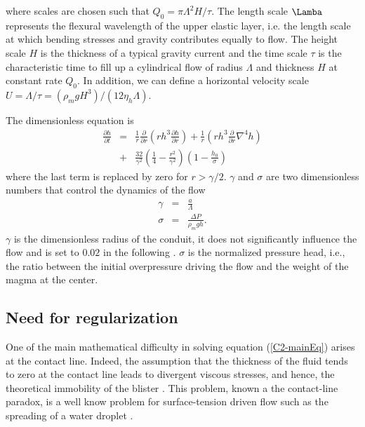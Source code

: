 where scales  are chosen  such that $Q_0  = \pi\Lambda^2  H/\tau$. The
length scale $\Lamba$ represents the  flexural wavelength of the upper
elastic layer,  i.e. the  length scale at  which bending  stresses and
gravity  contributes equally  to flow.   The height  scale $H$  is the
thickness of  a typical gravity current  and the time scale  $\tau$ is
the  characteristic time  to  fill  up a  cylindrical  flow of  radius
$\Lambda$ and thickness  $H$ at constant rate $Q_0$.   In addition, we
can       define        a       horizontal        velocity       scale
$U=\Lambda/\tau=\left(\rho_m           g           H^3\right)/\left(12
  \eta_h\Lambda\right)$.

The dimensionless equation is
\begin{eqnarray}
  \frac{\partial h}{\partial t}& =&\frac{1}{ r}
                                    \frac{\partial}{\partial r}  \left( rh^3  \frac{\partial h}{\partial
                                    r}\right)+\frac{1}{ r} \left( rh^3
                                    \frac{\partial}{\partial
                                    r}\nabla^4h\right)\nonumber\\
&+&
                                    \frac{32}{\gamma^{2}}\left(\frac{1}{4}-\frac{r^{2}}{\gamma^{2}}\right)\left(1-\frac{h_0}{\sigma}\right)
\label{C2-mainEq}
\end{eqnarray}
where the last term is replaced by zero for $r>\gamma/2$. $\gamma$
and $\sigma$ are  two dimensionless numbers that  control the dynamics
of the flow
\begin{eqnarray}
  \gamma &=& \frac{a}{\Lambda}\\
  \sigma &=& \frac{\Delta P}{\rho_m g h}.
\end{eqnarray}
$\gamma$  is the  dimensionless radius  of  the conduit,  it does  not
significantly influence the flow and is set to $0.02$ in the following
\citep{Michaut:2009jx,Michaut:2011kg}.   $\sigma$  is  the  normalized
pressure  head,  i.e.,  the  ratio between  the  initial  overpressure
driving the flow and the weight of the magma at the center.
	 
\subsection{Need for regularization}
\label{C2-sec:need-regularization}

One  of   the  main   mathematical  difficulty  in   solving  equation
(\ref{C2-mainEq}) arises at the  contact line.  Indeed, the assumption
that the  thickness of  the fluid  tends to zero  at the  contact line
leads  to  divergent  viscous  stresses, and  hence,  the  theoretical
immobility                of                the                blister
\citep{Flitton:1999iv,Lister:2013ia,Anonymous:QWXp_4JV}. This problem,
known  a  the  contact-line  paradox,  is  a  well  know  problem  for
surface-tension driven flow  such as the spreading of  a water droplet
\citep{Bertozzi:1998wz,Snoeijer:2013cm}.

